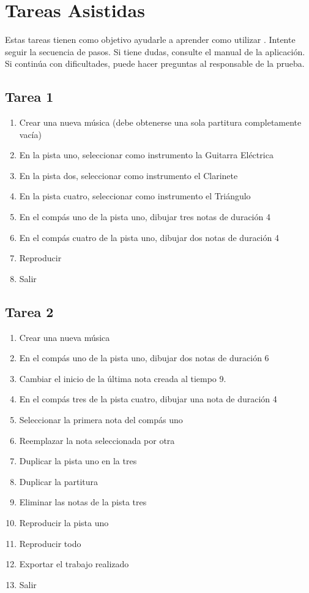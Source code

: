 \section{Tareas Asistidas}

Estas tareas tienen como objetivo ayudarle a aprender como utilizar .
Intente seguir la secuencia de pasos. Si tiene dudas, consulte el manual de la aplicaci\'on.
Si contin\'ua con dificultades, puede hacer preguntas al responsable de la prueba.

\subsection{Tarea 1}
\begin{enumerate}
    \item Crear una nueva m\'usica (debe obtenerse una sola partitura completamente vac\'ia)
    \item En la pista uno, seleccionar como instrumento la Guitarra El\'ectrica
    \item En la pista dos, seleccionar como instrumento el Clarinete
    \item En la pista cuatro, seleccionar como instrumento el Tri\'angulo
    \item En el comp\'as uno de la pista uno, dibujar tres notas de duraci\'on 4
    \item En el comp\'as cuatro de la pista uno, dibujar dos notas de duraci\'on 4
    \item Reproducir
    \item Salir
\end{enumerate}

\subsection{Tarea 2}
\begin{enumerate}
    \item Crear una nueva m\'usica
    \item En el comp\'as uno de la pista uno, dibujar dos notas de duraci\'on 6
    \item Cambiar el inicio de la \'ultima nota creada al tiempo 9.
    \item En el comp\'as tres de la pista cuatro, dibujar una nota de duraci\'on 4
    \item Seleccionar la primera nota del comp\'as uno
    \item Reemplazar la nota seleccionada por otra
    \item Duplicar la pista uno en la tres
    \item Duplicar la partitura
    \item Eliminar las notas de la pista tres
    \item Reproducir la pista uno
    \item Reproducir todo
    \item Exportar el trabajo realizado
    \item Salir
\end{enumerate}

